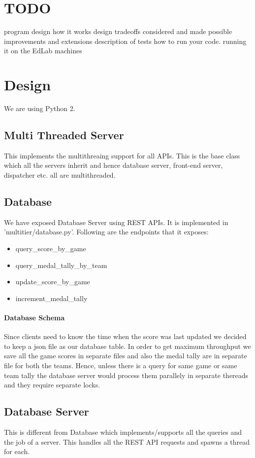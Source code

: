 \documentclass{article}
\begin{document}
\section{TODO}
program design 
how it works
design tradeoffs considered and made
possible improvements and extensions
description of tests
how to run your code.
running it on the EdLab machines
\section{Design}
We are using Python 2.

\subsection{Multi Threaded Server}
This implements the multithreaing support for all APIs. This is the base class which all the servers inherit and hence database server, front-end server, dispatcher etc. all are multithreaded.

\subsection{Database}
We have exposed Database Server using REST APIs. 
It is implemented in 'multitier/database.py'.
Following are the endpoints that it exposes:
\begin{itemize}
\item query\_score\_by\_game
\item query\_medal\_tally\_by\_team
\item update\_score\_by\_game
\item increment\_medal\_tally
\end{itemize}

\paragraph{Database Schema}
Since clients need to know the time when the score was last updated we 
decided to keep a json file as our database table. In order to get 
maximum throughput we save all the game scores in separate files and 
also the medal tally are in separate file for both the teams. Hence, 
unless there is a query for same game or same team tally the database
server would process them parallely in separate thereads and they 
require separate locks.


\subsection{Database Server}
This is different from Database which implements/supports all the queries and the job of a server. This handles all the REST API requests and spawns a thread for each.
\end{document}
